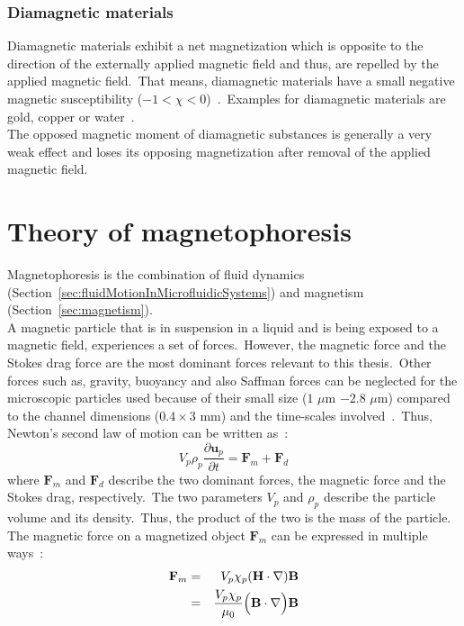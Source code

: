 \subsubsection{Diamagnetic materials}\label{subsec:dieamagneticMaterials}
Diamagnetic materials exhibit a net magnetization which is opposite to the direction of the externally applied magnetic field and thus, are repelled by the applied magnetic field.\ That means, diamagnetic materials have a small negative magnetic susceptibility ($-1<\chi<0$)~\cite{Cullity2011}.\ Examples for diamagnetic materials are gold, copper or water~\cite{Krishnan2016}.\\
The opposed magnetic moment of diamagnetic substances is generally a very weak effect and loses its opposing magnetization after removal of the applied magnetic field.\
%
\section{Theory of magnetophoresis}\label{sec:theoryOfMagnetophoresis}
Magnetophoresis is the combination of fluid dynamics (Section~\ref{sec:fluidMotionInMicrofluidicSystems}) and magnetism (Section~\ref{sec:magnetism}).\\
A magnetic particle that is in suspension in a liquid and is being exposed to a magnetic field, experiences a set of forces.\ However, the magnetic force and the Stokes drag force are the most dominant forces relevant to this thesis.\ Other forces such as, gravity, buoyancy and also Saffman forces can be neglected for the microscopic particles used because of their small size ($1$ $\mu$m $-2.8$ $\mu$m) compared to the channel dimensions ($0.4\times3$ mm) and the time-scales involved~\cite{McCloskey2000,Wirix-Speetjens2005,Saffman1965}.\ Thus, Newton's second law of motion can be written as~\cite{Kreyszig2006}:\
\begin{equation}
	V_{p}\rho_{p} \frac{\partial \mathbf{u}_{p}}{\partial t} = \mathbf{F}_{m}+\mathbf{F}_{d}
	\label{eqn:equationOfMotion}
\end{equation}
where $\mathbf{F}_{m}$ and $\mathbf{F}_{d}$ describe the two dominant forces, the magnetic force and the Stokes drag, respectively.\ The two parameters $V_{p}$ and $\rho_{p}$ describe the particle volume and its density.\ Thus, the product of the two is the mass of the particle.\\
The magnetic force on a magnetized object $\mathbf{F}_{m}$ can be expressed in multiple ways~\cite{Plonus1978}:\
\begin{eqnarray}
	\mathbf{F}_{m}	&=& V_{p} \chi_{p}(\mathbf{H}\cdot \nabla)\mathbf{B} 
	\label{eqn:magneticForceMagneticField} \\
	 						&=& \frac{V_{p} \chi_{p}}{\mu_{0}}\Bigl( \mathbf{B}\cdot \nabla \Bigr)\mathbf{B} 
	\label{eqn:magneticForceMagneticFlux}	
\end{eqnarray}
